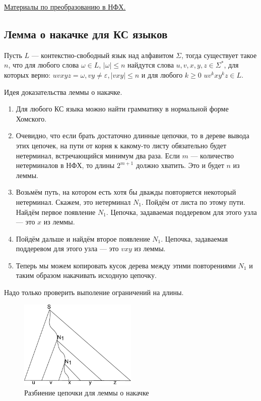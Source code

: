 \href{https://neerc.ifmo.ru/wiki/index.php?title=%D0%9D%D0%BE%D1%80%D0%BC%D0%B0%D0%BB%D1%8C%D0%BD%D0%B0%D1%8F_%D1%84%D0%BE%D1%80%D0%BC%D0%B0_%D0%A5%D0%BE%D0%BC%D1%81%D0%BA%D0%BE%D0%B3%D0%BE}{Материалы по преобразованию в НФХ.}


\subsection{Лемма о накачке для КС языков}

\begin{theorem}
Пусть $L$ --- контекстно-свободный язык над алфавитом $\Sigma$, тогда существует такое $n$, что для любого слова $\omega \in L$, $|\omega| \leq n$ найдутся слова $u,v,x,y,z\in \Sigma^*$, для которых верно: $uvxyz = \omega, vy\neq \varepsilon,|vxy|\leq n$ и для любого $k \geq 0$  $uv^kxy^kz \in L$.
\end{theorem}

Идея доказательства леммы о накачке.

\begin{enumerate}
    \item Для любого КС языка можно найти грамматику в нормальной форме Хомского.
    \item Очевидно, что если брать достаточно длинные цепочки, то в дереве вывода этих цепочек, на пути от корня к какому-то листу обязательно будет нетерминал, встречающийся минимум два раза. Если $m$ --- количество нетерминалов в НФХ, то длины $2^{m+1}$ должно хватить. Это и будет $n$ из леммы.
    \item Возьмём путь, на котором есть хотя бы дважды повторяется некоторый нетерминал. Скажем, это нетерминал  $N_1$. Пойдём от листа по этому пути. Найдём первое появление $N_1$. Цепочка, задаваемая поддеревом для этого узла --- это $x$ из леммы.
    \item Пойдём дальше и найдём второе появление $N_1$. Цепочка, задаваемая поддеревом для этого узла --- это $vxy$ из леммы.
    \item Теперь мы можем копировать кусок дерева между этими повторениями $N_1$ и таким образом накачивать исходную цепочку.
\end{enumerate}

Надо только проверить выполение ограничений на длины.

\begin{figure}
\centering
\includegraphics[width=0.5\textwidth]{figures/pumping_tree_1.pdf}
\caption{Разбиение цепочки для леммы о накачке}
\label{fig:pumping1}
\end{figure}

